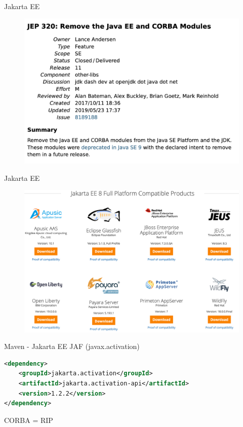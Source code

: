 \documentclass[aspectratio=169]{beamer}
\begin{document}
\begin{frame}[fragile]{Jakarta EE}

    \begin{figure}
        \centering
        \includegraphics[width=0.7\linewidth]{Images/jep320}
    \end{figure}
\end{frame}


\begin{frame}[fragile]{Jakarta EE}

    \begin{figure}
        \centering
        \includegraphics[width=\linewidth]{Images/jakarta}
    \end{figure}
\end{frame}


\begin{frame}[fragile]{Maven - Jakarta EE}
JAF (javax.activation)

\begin{lstlisting}[language=xml]
<dependency>
    <groupId>jakarta.activation</groupId>
    <artifactId>jakarta.activation-api</artifactId>
    <version>1.2.2</version>
</dependency>
\end{lstlisting}



CORBA = RIP
\end{frame}
\end{document}
